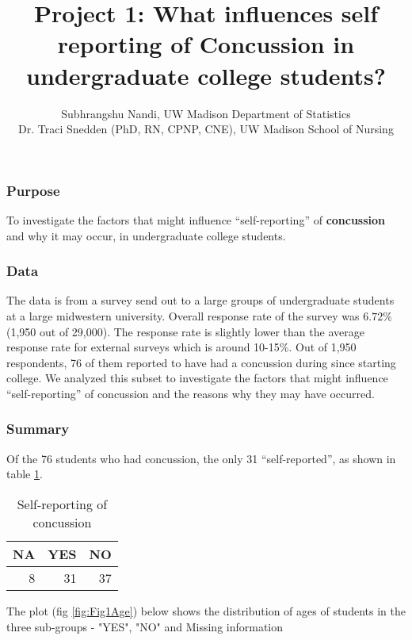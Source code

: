 \documentclass[11]{article}
\begin{document}

\doublespacing

\title{Project 1: What influences self reporting of Concussion in undergraduate college students?}
\author{Subhrangshu Nandi, UW Madison Department of Statistics \\
Dr. Traci Snedden (PhD, RN, CPNP, CNE), UW Madison School of Nursing
}
\maketitle
\subsubsection*{Purpose}
To investigate the factors that might influence ``self-reporting'' of {\bf{concussion}} and why it may occur, in undergraduate college students. 

\subsubsection*{Data}
The data is from a survey send out to a large groups of undergraduate students at a large midwestern university. Overall response rate of the survey was $6.72\%$ (1,950 out of 29,000). The response rate is slightly lower than the average response rate for external surveys which is around 10-15\%. Out of 1,950 respondents, 76 of them reported to have had a concussion during since starting college. We analyzed this subset to investigate the factors that might influence ``self-reporting'' of concussion and the reasons why they may have occurred. 

\subsubsection*{Summary}
Of the 76 students who had concussion, the only 31 ``self-reported'', as shown in table \ref{tab:tab1Summary}.
\begin{table}[ht]
\centering
\begin{tabular}{rrr}
  \hline
NA & YES & NO \\ 
  \hline
  8 &  31 &  37 \\ 
   \hline
\end{tabular}
\caption{Self-reporting of concussion} 
\label{tab:tab1Summary}
\end{table}
The plot (fig \ref{fig:Fig1Age}) below shows the distribution of ages of students in the three sub-groups - "YES", "NO" and Missing information
\end{document}
